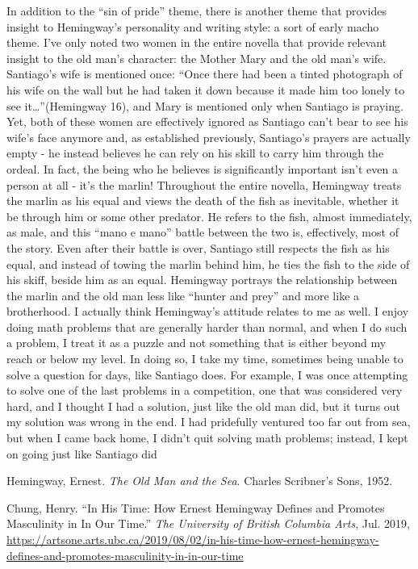 \documentclass[11pt]{scrartcl}
\begin{document}
\begin{spacing}{2}
In addition to the ``sin of pride'' theme, there is another theme that provides insight to Hemingway's personality and writing style: a sort of early macho theme. I've only noted two women in the entire novella that provide relevant insight to the old man's character: the Mother Mary and the old man's wife. Santiago's wife is mentioned once: “Once there had been a tinted photograph of his wife on the wall but he had taken it down because it made him too lonely to see it…”(Hemingway 16), and Mary is mentioned only when Santiago is praying. Yet, both of these women are effectively ignored as Santiago can't bear to see his wife's face anymore and, as established previously, Santiago's prayers are actually empty - he instead believes he can rely on his skill to carry him through the ordeal. In fact, the being who he believes is significantly important isn't even a person at all - it's the marlin! Throughout the entire novella, Hemingway treats the marlin as his equal and views the death of the fish as inevitable, whether it be through him or some other predator. He refers to the fish, almost immediately, as male, and this ``mano e mano'' battle between the two is, effectively, most of the story. Even after their battle is over, Santiago still respects the fish as his equal, and instead of towing the marlin behind him, he ties the fish to the side of his skiff, beside him as an equal. Hemingway portrays the relationship between the marlin and the old man less like ``hunter and prey'' and more like a brotherhood.
I actually think Hemingway's attitude relates to me as well. I enjoy doing math problems that are generally harder than normal, and when I do such a problem, I treat it as a puzzle and not something that is either beyond my reach or below my level. In doing so, I take my time, sometimes being unable to solve a question for days, like Santiago does. For example, I was once attempting to solve one of the last problems in a competition, one that was considered very hard, and I thought I had a solution, just like the old man did, but it turns out my solution was wrong in the end. I had pridefully ventured too far out from sea, but when I came back home, I didn't quit solving math problems; instead, I kept on going just like Santiago did


\pagebreak
\end{spacing}
\begin{thebibliography}{}


Hemingway, Ernest. \textit{The Old Man and the Sea}. Charles Scribner's Sons, 1952.

Chung, Henry. ``In His Time: How Ernest Hemingway Defines and Promotes Masculinity in In Our Time.'' \textit{The University of British Columbia Arts}, Jul. 2019, \href{https://artsone.arts.ubc.ca/2019/08/02/in-his-time-how-ernest-hemingway-defines-and-promotes-masculinity-in-in-our-time}{https://artsone.arts.ubc.ca/2019/08/02/in-his-time-how-ernest-hemingway-defines-and-promotes-masculinity-in-in-our-time}

\end{thebibliography}
\end{document}
